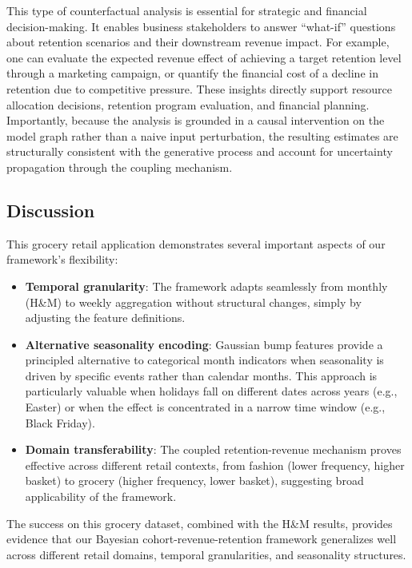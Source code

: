 \documentclass[11pt]{amsart}
\theoremstyle{definition}
\begin{document}
This type of counterfactual analysis is essential for strategic and financial decision-making. It enables
business stakeholders to answer ``what-if'' questions about retention scenarios and their downstream revenue
impact. For example, one can evaluate the expected revenue effect of achieving a target retention level through
a marketing campaign, or quantify the financial cost of a decline in retention due to competitive pressure.
These insights directly support resource allocation decisions, retention program evaluation, and financial
planning. Importantly, because the analysis is grounded in a causal intervention on the model graph rather
than a naive input perturbation, the resulting estimates are structurally consistent with the generative
process and account for uncertainty propagation through the coupling mechanism.

\subsection{Discussion}

This grocery retail application demonstrates several important aspects of our framework's flexibility:

\begin{itemize}
    \item \textbf{Temporal granularity}: The framework adapts seamlessly from monthly (H\&M) to weekly aggregation
          without structural changes, simply by adjusting the feature definitions.
    \item \textbf{Alternative seasonality encoding}: Gaussian bump features provide a principled alternative to
          categorical month indicators when seasonality is driven by specific events rather than calendar months.
          This approach is particularly valuable when holidays fall on different dates across years (e.g., Easter)
          or when the effect is concentrated in a narrow time window (e.g., Black Friday).
    \item \textbf{Domain transferability}: The coupled retention-revenue mechanism proves effective across different
          retail contexts, from fashion (lower frequency, higher basket) to grocery (higher frequency, lower basket),
          suggesting broad applicability of the framework.
\end{itemize}

The success on this grocery dataset, combined with the H\&M results, provides evidence that our Bayesian
cohort-revenue-retention framework generalizes well across different retail domains, temporal granularities,
and seasonality structures.
\end{document}
